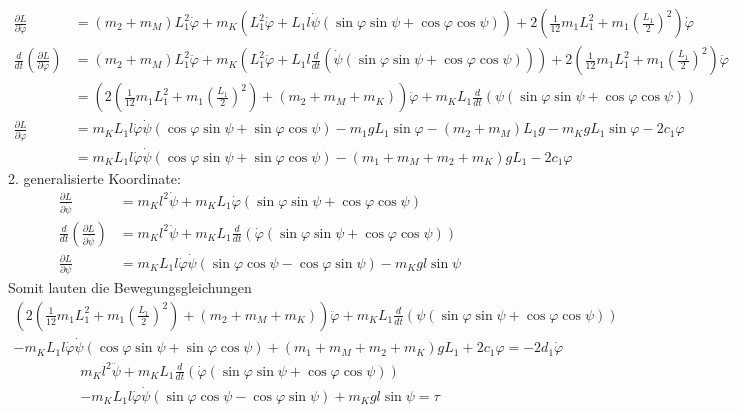 \begin{align*}
	\frac{\partial L}{\partial \dot{\varphi}} &= \left(m_2 + m_M\right)L_1^2\dot{\varphi} + m_K \left( L_1^2\dot{\varphi} + L_1l\dot{\psi}\left(\sin\varphi \sin\psi + \cos \varphi \cos\psi\right)\right) + 2\left(\frac{1}{12}m_1L_1^2 + m_1\left(\frac{L_1}{2}\right)^2\right)\dot{\varphi} \\
	\frac{d}{dt}\left(\frac{\partial L}{\partial \dot{\varphi}}\right) &= \left(m_2 + m_M\right)L_1^2 \ddot{\varphi} + m_K \left( L_1^2\ddot{\varphi} + L_1l\frac{d}{dt}\left(\dot{\psi}\left(\sin\varphi \sin\psi + \cos \varphi \cos\psi\right)\right)\right) + 2\left(\frac{1}{12}m_1L_1^2 + m_1\left(\frac{L_1}{2}\right)^2\right)\ddot{\varphi}\\
	&= \left( 2\left(\frac{1}{12}m_1L_1^2 + m_1\left(\frac{L_1}{2}\right)^2\right) + \left( m_2 + m_M + m_K\right)\right)\ddot{\varphi} + m_K L_1 \frac{d}{dt}\left(\psi\left(\sin\varphi \sin\psi + \cos\varphi \cos\psi\right)\right) \\
	\frac{\partial L}{\partial \varphi} &= m_KL_1l\dot{\varphi}\dot{\psi}\left(\cos\varphi \sin\psi + \sin\varphi \cos\psi\right)-m_1gL_1\sin\varphi - \left(m_2 + m_M\right)L_1g - m_KgL_1\sin\varphi - 2c_1\varphi \\
	&= m_KL_1l\dot{\varphi}\dot{\psi}\left(\cos\varphi \sin\psi + \sin\varphi \cos\psi\right) - \left(m_1 + m_M + m_2 + m_K\right)gL_1 - 2c_1\varphi
\end{align*}
2. generalisierte Koordinate:
\begin{align*}
	\frac{\partial L}{\partial \dot{\psi}} &= m_Kl^2\dot{\psi} + m_KL_1 \dot{\varphi}\left(\sin\varphi \sin\psi + \cos\varphi \cos\psi\right) \\
	\frac{d}{dt} \left(\frac{\partial L}{\partial \dot{\psi} }\right) &= m_Kl^2\ddot{\psi} + m_KL_1 \frac{d}{dt}\left(\dot{\varphi}\left(\sin\varphi \sin\psi + \cos\varphi \cos\psi\right)\right) \\
	\frac{\partial L}{\partial \psi} &= m_KL_1l\dot{\varphi}\dot{\psi}\left(\sin\varphi \cos\psi - \cos\varphi \sin\psi\right) - m_Kgl\sin\psi
\end{align*}
Somit lauten die Bewegungsgleichungen
\begin{align*}
	\left(2\left(\frac{1}{12}m_1L_1^2 + m_1\left(\frac{L_1}{2}\right)^2\right) + \left( m_2 + m_M + m_K\right)\right)\ddot{\varphi} + m_K L_1 \frac{d}{dt}\left(\psi\left(\sin\varphi \sin\psi + \cos\varphi \cos\psi\right)\right) \\
	- m_KL_1l\dot{\varphi}\dot{\psi}\left(\cos\varphi \sin\psi + \sin\varphi \cos\psi\right) + \left(m_1 + m_M + m_2 + m_K\right)gL_1 + 2c_1\varphi = -2d_1\dot{\varphi}
\end{align*}
\begin{align*}
	m_Kl^2\ddot{\psi} + m_KL_1 \frac{d}{dt}\left(\dot{\varphi}\left(\sin\varphi \sin\psi + \cos\varphi \cos\psi\right)\right) \\
	- m_KL_1l\dot{\varphi}\dot{\psi}\left(\sin\varphi \cos\psi - \cos\varphi \sin\psi\right) + m_Kgl\sin\psi = \tau
\end{align*}